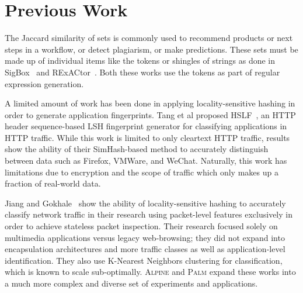 \section{Previous Work}

The Jaccard similarity of sets is commonly used to recommend products or next steps in a workflow, or detect plagiarism, or make predictions. These sets must be made up of individual items like the tokens or shingles of strings as done in SigBox~\cite{sigbox} and RExACtor~\cite{rexactor}. Both these works use the tokens as part of regular expression generation.

A limited amount of work has been done in applying locality-sensitive hashing in order to generate application fingerprints. Tang et al proposed HSLF~\cite{hslf}, an HTTP header sequence-based LSH fingerprint generator for classifying applications in HTTP traffic. While this work is limited to only cleartext HTTP traffic, results show the ability of their SimHash-based method to accurately distinguish between data such as Firefox, VMWare, and WeChat. Naturally, this work has limitations due to encryption and the scope of traffic which only makes up a fraction of real-world data.

Jiang and Gokhale~\cite{fpga} show the ability of locality-sensitive hashing to accurately classify network traffic in their research using packet-level features exclusively in order to achieve stateless packet inspection. Their research focused solely on multimedia applications versus legacy web-browsing; they did not expand into encapsulation architectures and more traffic classes as well as application-level identification. They also use K-Nearest Neighbors clustering for classification, which is known to scale sub-optimally. \textsc{Alpine} and \textsc{Palm} expand these works into a much more complex and diverse set of experiments and applications.
